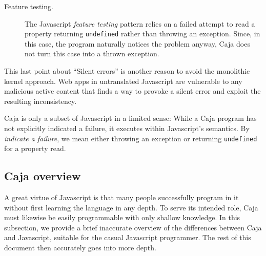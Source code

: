 \documentclass[letterpaper,twocolumn,10pt]{article}
\newcommand{\code}[1]{{\tt {#1}}}              %
\begin{document}
\begin{description}
  \item[Feature testing.] The Javascript \emph{feature testing} pattern 
  relies on a failed attempt to read a property returning \code{undefined} 
  rather than throwing an exception. Since, in this case, the program 
  naturally notices the problem anyway, Caja does not turn this case into a 
  thrown exception.
    
\end{description}

This last point about ``Silent errors'' is another reason to avoid the 
monolithic kernel approach. Web apps in untranslated Javascript are 
vulnerable to any malicious active content that finds a way to provoke a 
silent error and exploit the resulting inconsistency.

Caja is only a subset of Javascript in a limited sense: While a Caja program 
has not explicitly indicated a failure, it executes within Javascript's 
semantics. By \emph{indicate a failure}, we mean either throwing an exception 
or returning \code{undefined} for a property read. 

\subsection{Caja overview}

A great virtue of Javascript is that many people successfully program in it 
without first learning the language in any depth. To serve its intended role, 
Caja must likewise be easily programmable with only shallow knowledge. In 
this subsection, we provide a brief inaccurate overview of the differences 
between Caja and Javascript, suitable for the casual Javascript programmer. 
The rest of this document then accurately goes into more depth.
\end{document}
